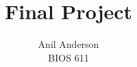 \documentclass[12pt]{article}
\begin{document}
 
\title{Final Project}
\author{Anil Anderson\\
BIOS 611}
 
\maketitle
\end{document}
